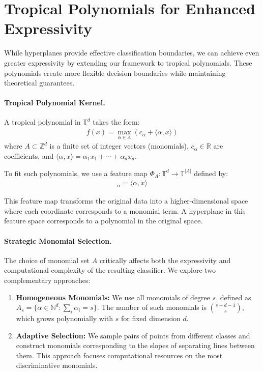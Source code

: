 \documentclass{article}
\newcommand{\R}{\mathbb{R}}
\newcommand{\trop}{\mathbb{T}}
\begin{document}
\section{Tropical Polynomials for Enhanced Expressivity}\label{sec:polynomials}

While hyperplanes provide effective classification boundaries, we can achieve even greater expressivity by extending our framework to tropical polynomials. These polynomials create more flexible decision boundaries while maintaining theoretical guarantees.

\paragraph{Tropical Polynomial Kernel.}
A tropical polynomial in $\trop^d$ takes the form:
\begin{align}
f(x) = \max_{\alpha \in A} (c_\alpha + \langle \alpha, x \rangle)
\end{align}
where $A \subset \mathbb{Z}^d$ is a finite set of integer vectors (monomials), $c_\alpha \in \R$ are coefficients, and $\langle \alpha, x \rangle = \alpha_1 x_1 + \cdots + \alpha_d x_d$.

To fit such polynomials, we use a feature map $\Phi_A: \trop^d \to \trop^{|A|}$ defined by:
\begin{align}
[\Phi_A(x)]_\alpha = \langle \alpha, x \rangle
\end{align}

This feature map transforms the original data into a higher-dimensional space where each coordinate corresponds to a monomial term. A hyperplane in this feature space corresponds to a polynomial in the original space.

\paragraph{Strategic Monomial Selection.}
The choice of monomial set $A$ critically affects both the expressivity and computational complexity of the resulting classifier. We explore two complementary approaches:

\begin{enumerate}
    \item \textbf{Homogeneous Monomials:} We use all monomials of degree $s$, defined as 
    $A_s = \{\alpha \in \mathbb{N}^d : \sum_i \alpha_i = s\}$. The number of such monomials is $\binom{s+d-1}{s}$, which grows polynomially with $s$ for fixed dimension $d$.
    
    \item \textbf{Adaptive Selection:} We sample pairs of points from different classes and construct monomials corresponding to the slopes of separating lines between them. This approach focuses computational resources on the most discriminative monomials.
\end{enumerate}
\end{document}
